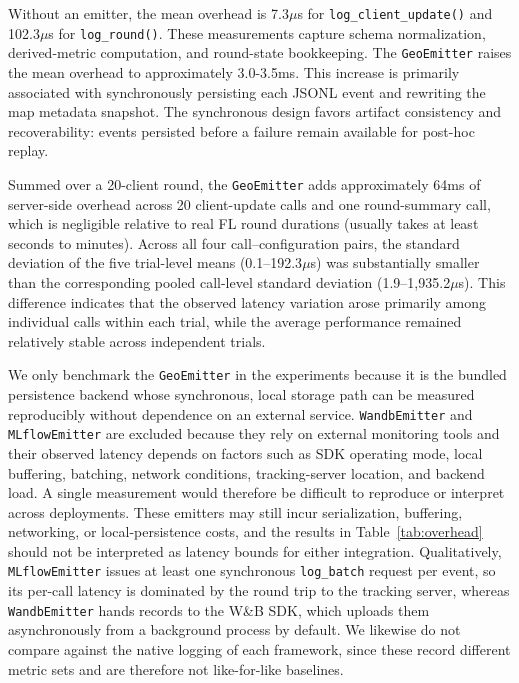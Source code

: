\documentclass[preprint,12pt, a4paper]{elsarticle}
\newcommand{\rev}[1]{{\color{blue}#1}}
\newcommand{\rev}[1]{#1}
\begin{document}
Without an emitter, the mean overhead is 7.3$\mu$s for \texttt{log\_client\_update()} and 102.3$\mu$s for \texttt{log\_round()}. These measurements capture schema normalization, derived-metric computation, and round-state bookkeeping. The \texttt{GeoEmitter} raises the mean overhead to approximately 3.0-3.5ms. This increase is primarily associated with synchronously persisting each JSONL event and rewriting the map metadata snapshot. The synchronous design favors artifact consistency and recoverability: events persisted before a failure remain available for post-hoc replay.

Summed over a 20-client round, the \texttt{GeoEmitter} adds approximately 64ms of server-side overhead across 20 client-update calls and one round-summary call, which is negligible relative to real FL round durations (usually takes at least seconds to minutes). Across all four call--configuration pairs, the standard deviation of the five trial-level means (0.1--192.3$\mu$s) was substantially smaller than the corresponding pooled call-level standard deviation (1.9--1{,}935.2$\mu$s). This difference indicates that the observed latency variation arose primarily among individual calls within each trial, while the average performance remained relatively stable across independent trials.

We only benchmark the \texttt{GeoEmitter} in the experiments because it is the bundled persistence backend whose synchronous, local storage path can be measured reproducibly without dependence on an external service. \texttt{WandbEmitter} and \texttt{MLflowEmitter} are excluded because they rely on external monitoring tools and their observed latency depends on factors such as SDK operating mode, local buffering, batching, network conditions, tracking-server location, and backend load. A single measurement would therefore be difficult to reproduce or interpret across deployments. These emitters may still incur serialization, buffering, networking, or local-persistence costs, and the results in Table~\ref{tab:overhead} should not be interpreted as latency bounds for either integration. \rev{Qualitatively, \texttt{MLflowEmitter} issues at least one synchronous \texttt{log\_batch} request per event, so its per-call latency is dominated by the round trip to the tracking server, whereas \texttt{WandbEmitter} hands records to the W\&B SDK, which uploads them asynchronously from a background process by default. We likewise do not compare against the native logging of each framework, since these record different metric sets and are therefore not like-for-like baselines.}
\end{document}
